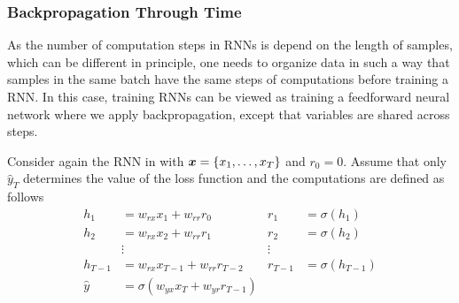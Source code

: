 
\subsubsection{Backpropagation Through Time}
As the number of computation steps in RNNs is depend on the length of samples, which can be different in principle, one needs to organize data in such a way that samples in the same batch have the same steps of computations before training a RNN. In this case, training RNNs can be viewed as training a feedforward neural network where we apply backpropagation,  except that variables are shared across steps. 

Consider again the RNN in \addfigure{\ref{fig:rnn_unfold}} with $\boldsymbol{x} = \{x_1, \dots, x_T \}$ and $r_0 = 0$. Assume that only $\hat{y}_T$ determines the value of the loss function and the computations are defined as follows 
\begin{align}
	h_1 &= w_{rx} x_1 + w_{rr} r_0 & r_1 &= \sigma(h_1) \label{eq:naive_r} \\
	h_2 &= w_{rx} x_2 + w_{rr} r_1 &  r_2 &= \sigma(h_2) \\
	& \vdots & \vdots \\
	h_{T-1} &= w_{rx} x_{T-1} + w_{rr} r_{T-2} &  r_{T-1} &= \sigma(h_{T-1}) \\
	\hat{y} &= \sigma(w_{yx} x_T   + w_{yr} r_{T-1})
\end{align}

